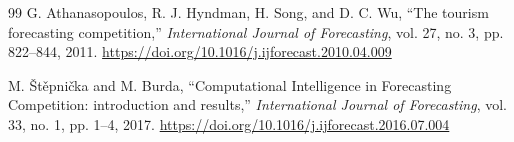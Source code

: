 \documentclass[review,number,sort&compress]{elsarticle}
\begin{document}
\begin{thebibliography}{99}
G. Athanasopoulos, R. J. Hyndman, H. Song, and D. C. Wu, ``The tourism forecasting competition,'' \emph{International Journal of Forecasting}, vol. 27, no. 3, pp. 822--844, 2011. \url{https://doi.org/10.1016/j.ijforecast.2010.04.009}

M. \v{S}t\v{e}pni\v{c}ka and M. Burda, ``Computational Intelligence in Forecasting Competition: introduction and results,'' \emph{International Journal of Forecasting}, vol. 33, no. 1, pp. 1--4, 2017. \url{https://doi.org/10.1016/j.ijforecast.2016.07.004}

\end{thebibliography}
\end{document}
